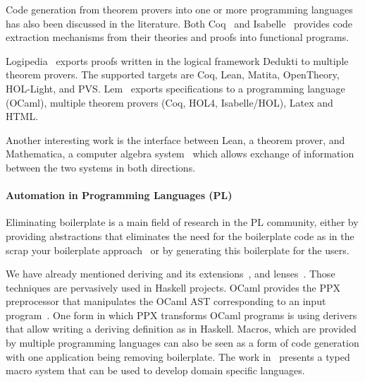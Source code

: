 Code generation from theorem provers into one or more programming languages has also been discussed in the literature. Both Coq~\cite{CoqCodegen2003, cruz2003program} and Isabelle~\cite{IsabelleCodegen2010} provides code extraction mechanisms from their theories and proofs into functional programs. 

Logipedia~\cite{Dowek2019LogipediaAM} exports proofs written in the logical framework Dedukti to multiple theorem provers. The supported targets are Coq, Lean, Matita, OpenTheory, HOL-Light, and PVS. 
Lem~\cite{lem2014} exports specifications to a programming language (OCaml), multiple theorem provers (Coq, HOL4, Isabelle/HOL), Latex and HTML. 

Another interesting work is the interface between Lean, a theorem prover, and Mathematica, a computer algebra system~\cite{Lewis_2017} which allows exchange of information between the two systems in both directions.  



\paragraph{Automation in Programming Languages (PL)}
Eliminating boilerplate is a main field of research in the PL community, either by providing abstractions that eliminates the need for the boilerplate code as in the scrap your boilerplate approach~\cite{syb2003Jones} or by generating this boilerplate for the users.  

We have already mentioned deriving and its extensions~\cite{loeh2010genericDeriving, loeh2018derivingVia}, and lenses~\cite{lensesLib}. Those techniques are pervasively used in Haskell projects.
OCaml provides the PPX preprocessor that manipulates the OCaml AST corresponding to an input program~\cite{ocaml2019ppx}. One form in which PPX transforms OCaml programs is using derivers that allow writing a deriving definition as in Haskell. 
Macros, which are provided by multiple programming languages can also be seen as a form of code generation with one application being removing boilerplate. The work in~\cite{macros2001msp} presents a typed macro system that can be used to develop domain specific languages. 


